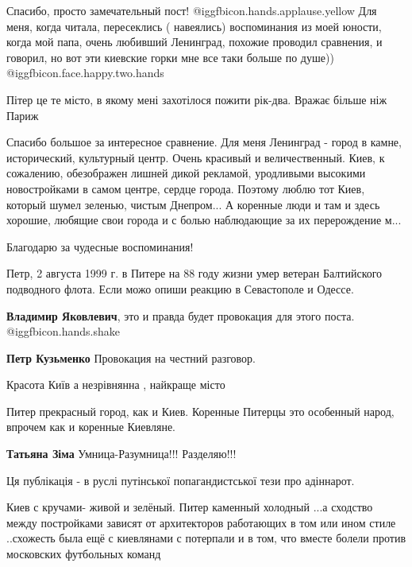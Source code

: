 \begin{itemize}
Спасибо, просто замечательный пост! @igg{fbicon.hands.applause.yellow} 
Для меня, когда читала, пересеклись
( навеялись) воспоминания из моей юности, когда мой папа, очень любивший Ленинград, похожие проводил сравнения, и говорил, но вот эти киевские горки мне все таки больше по душе)) @igg{fbicon.face.happy.two.hands} 

Пітер це те місто, в якому мені захотілося пожити рік-два. Вражає більше ніж Париж


Спасибо большое за интересное сравнение. Для меня Ленинград - город в камне,
исторический, культурный центр. Очень красивый и величественный. Киев, к
сожалению, обезображен лишней дикой рекламой, уродливыми высокими новостройками
в самом центре, сердце города. Поэтому люблю тот Киев, который шумел зеленью,
чистым Днепром... А коренные люди и там и здесь хорошие, любящие свои города и
с болью наблюдающие за их перерождение м...

Благодарю за чудесные воспоминания!


Петр, 2 августа 1999 г. в Питере на 88 году жизни умер ветеран Балтийского
подводного флота. Если можо опиши реакцию в Севастополе и Одессе.

\begin{itemize} %
\textbf{Владимир Яковлевич}, это и правда будет провокация для этого поста. @igg{fbicon.hands.shake} 

\textbf{Петр Кузьменко} Провокация на честний разговор.
\end{itemize} %

Красота Київ а незрівнянна , найкраще місто

Питер прекрасный город, как и Киев. Коренные Питерцы это особенный народ, впрочем как и коренные Киевляне.

\begin{itemize} %
\textbf{Татьяна Зіма} Умница-Разумница!!! Разделяю!!!
\end{itemize} %

Ця публікація - в руслі путінської попагандистської тези про адіннарот.


Киев с кручами- живой и зелёный. Питер каменный холодный ...а сходство между
постройками зависят от архитекторов работающих в том или ином стиле ..схожесть
была ещё с киевлянами с потерпали и в том, что вместе болели против московских
футбольных команд


\end{itemize}
